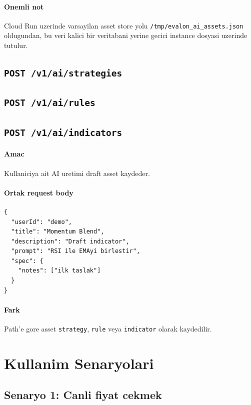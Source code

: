 \documentclass[11pt,a4paper]{article}
\begin{document}
\paragraph{Onemli not}
Cloud Run uzerinde varsayilan asset store yolu \texttt{/tmp/evalon\_ai\_assets.json} oldugundan, bu veri kalici bir veritabani yerine gecici instance dosyasi uzerinde tutulur.

\subsection{\texttt{POST /v1/ai/strategies}}
\subsection*{\texttt{POST /v1/ai/rules}}
\subsection*{\texttt{POST /v1/ai/indicators}}

\paragraph{Amac}
Kullaniciya ait AI uretimi draft asset kaydeder.

\paragraph{Ortak request body}
\begin{lstlisting}
{
  "userId": "demo",
  "title": "Momentum Blend",
  "description": "Draft indicator",
  "prompt": "RSI ile EMAyi birlestir",
  "spec": {
    "notes": ["ilk taslak"]
  }
}
\end{lstlisting}

\paragraph{Fark}
Path'e gore asset \texttt{strategy}, \texttt{rule} veya \texttt{indicator} olarak kaydedilir.

\section{Kullanim Senaryolari}

\subsection{Senaryo 1: Canli fiyat cekmek}
\end{document}
